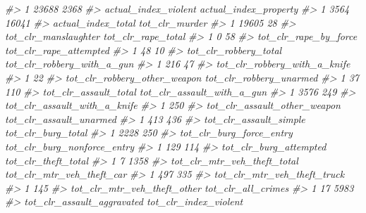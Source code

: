 \documentclass[
]{krantz}
\makeatletter
\newenvironment{Shaded}{\begin{snugshade}}{\end{snugshade}}
\newcommand{\CommentTok}[1]{\textcolor[rgb]{0.37,0.37,0.37}{\textit{#1}}}
\newenvironment{kframe}{%
\medskip{}
\setlength{\fboxsep}{.8em}
 \def\at@end@of@kframe{}%
 \ifinner\ifhmode%
  \def\at@end@of@kframe{\end{minipage}}%
  \begin{minipage}{\columnwidth}%
 \fi\fi%
 \def\FrameCommand##1{\hskip\@totalleftmargin \hskip-\fboxsep
 \colorbox{shadecolor}{##1}\hskip-\fboxsep
     \hskip-\linewidth \hskip-\@totalleftmargin \hskip\columnwidth}%
 \MakeFramed {\advance\hsize-\width
   \@totalleftmargin\z@ \linewidth\hsize
   \@setminipage}}%
 {\par\unskip\endMakeFramed%
 \at@end@of@kframe}
\renewenvironment{Shaded}{\begin{kframe}}{\end{kframe}}
\makeatother
\begin{document}
\begin{Shaded}
\begin{Highlighting}[]
\CommentTok{\#\textgreater{} 1             23688                      2368}
\CommentTok{\#\textgreater{}   actual\_index\_violent actual\_index\_property}
\CommentTok{\#\textgreater{} 1                 3564                 16041}
\CommentTok{\#\textgreater{}   actual\_index\_total tot\_clr\_murder}
\CommentTok{\#\textgreater{} 1              19605             28}
\CommentTok{\#\textgreater{}   tot\_clr\_manslaughter tot\_clr\_rape\_total}
\CommentTok{\#\textgreater{} 1                    0                 58}
\CommentTok{\#\textgreater{}   tot\_clr\_rape\_by\_force tot\_clr\_rape\_attempted}
\CommentTok{\#\textgreater{} 1                    48                     10}
\CommentTok{\#\textgreater{}   tot\_clr\_robbery\_total tot\_clr\_robbery\_with\_a\_gun}
\CommentTok{\#\textgreater{} 1                   216                         47}
\CommentTok{\#\textgreater{}   tot\_clr\_robbery\_with\_a\_knife}
\CommentTok{\#\textgreater{} 1                           22}
\CommentTok{\#\textgreater{}   tot\_clr\_robbery\_other\_weapon tot\_clr\_robbery\_unarmed}
\CommentTok{\#\textgreater{} 1                           37                     110}
\CommentTok{\#\textgreater{}   tot\_clr\_assault\_total tot\_clr\_assault\_with\_a\_gun}
\CommentTok{\#\textgreater{} 1                  3576                        249}
\CommentTok{\#\textgreater{}   tot\_clr\_assault\_with\_a\_knife}
\CommentTok{\#\textgreater{} 1                          250}
\CommentTok{\#\textgreater{}   tot\_clr\_assault\_other\_weapon tot\_clr\_assault\_unarmed}
\CommentTok{\#\textgreater{} 1                          413                     436}
\CommentTok{\#\textgreater{}   tot\_clr\_assault\_simple tot\_clr\_burg\_total}
\CommentTok{\#\textgreater{} 1                   2228                250}
\CommentTok{\#\textgreater{}   tot\_clr\_burg\_force\_entry tot\_clr\_burg\_nonforce\_entry}
\CommentTok{\#\textgreater{} 1                      129                         114}
\CommentTok{\#\textgreater{}   tot\_clr\_burg\_attempted tot\_clr\_theft\_total}
\CommentTok{\#\textgreater{} 1                      7                1358}
\CommentTok{\#\textgreater{}   tot\_clr\_mtr\_veh\_theft\_total tot\_clr\_mtr\_veh\_theft\_car}
\CommentTok{\#\textgreater{} 1                         497                       335}
\CommentTok{\#\textgreater{}   tot\_clr\_mtr\_veh\_theft\_truck}
\CommentTok{\#\textgreater{} 1                         145}
\CommentTok{\#\textgreater{}   tot\_clr\_mtr\_veh\_theft\_other tot\_clr\_all\_crimes}
\CommentTok{\#\textgreater{} 1                          17               5983}
\CommentTok{\#\textgreater{}   tot\_clr\_assault\_aggravated tot\_clr\_index\_violent}

\end{Highlighting}
\end{Shaded}
\end{document}
